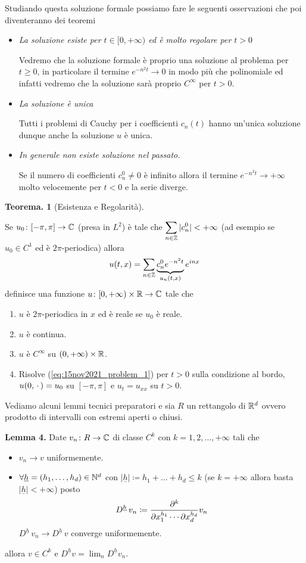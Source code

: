 Studiando questa soluzione formale possiamo fare le seguenti osservazioni che poi diventeranno dei teoremi
\begin{itemize}
	\item \textit{La soluzione esiste per $t \in [0, +\infty)$ ed è molto regolare per $t > 0$}

		Vedremo che la soluzione formale è proprio una soluzione al problema per $t \geq 0$, in particolare il termine $e^{-n^2 t} \to 0$ in modo più che polinomiale ed infatti vedremo che la soluzione sarà proprio $C^\infty$ per $t > 0$.

	\item \textit{La soluzione è unica}

		Tutti i problemi di Cauchy per i coefficienti $c_n(t)$ hanno un'unica soluzione dunque anche la soluzione $u$ è unica.

	\item \textit{In generale non esiste soluzione nel passato.}

		Se il numero di coefficienti $c_n^0 \neq 0$ è infinito allora il termine $e^{-n^2 t} \to +\infty$ molto velocemente per $t < 0$ e la serie diverge.

\end{itemize}

\textbf{Teorema. 1} (Esistenza e Regolarità).

Se $u_0 \colon [-\pi, \pi] \to \mathbb C$ (presa in $L^2$) è tale che $\displaystyle \sum_{n \in \mathbb Z} |c_n^0| < +\infty$ (ad esempio se $u_0 \in C^1$ ed è $2\pi$-periodica) allora
$$
u(t, x) = \sum_{n \in \mathbb Z} \underbrace{c_n^0 e^{-n^2 t}}_{u_n(t,x)} e^{inx}
$$
definisce una funzione $u \colon [0, +\infty) \times \mathbb R \to \mathbb C$ tale che
\begin{enumerate}
	\item $u$ è $2\pi$-periodica in $x$ ed è reale se $u_0$ è reale.
	\item $u$ è continua.
	\item $u$ è $C^\infty$ su $(0, +\infty) \times \mathbb R$.
	\item Risolve (\ref{eq:15nov2021_problem_1}) per $t > 0$ sulla condizione al bordo, $u(0, \,\cdot\,) = u_0$ su $[-\pi, \pi]$ e $u_t = u_{xx}$ su $t > 0$.
\end{enumerate}

Vediamo alcuni lemmi tecnici preparatori e sia $R$ un rettangolo di $\mathbb R^d$ ovvero prodotto di intervalli con estremi aperti o chiusi.

\textbf{Lemma 4.}
Date $v_n \colon R \to \mathbb C$ di classe $C^k$ con $k = 1, 2, \dots, +\infty$ tali che
\begin{itemize}
	\item $v_n \to v$ uniformemente.

	\item $\forall \underline h = (h_1, \dots, h_d) \in \mathbb N^d$ con $|\underline h| \coloneqq h_1 + \dots + h_d \leq k$ (se $k = +\infty$ allora basta $|\underline h| < +\infty$) posto
		$$
		D^{\underline h} \, v_n \coloneqq
		\frac{\partial^k}{\partial x_1^{h_1} \cdots \partial x_d^{h_d}} v_n
		$$
		$D^{\underline h} \, v_n \to D^{\underline h} \, v$ converge uniformemente.
\end{itemize}
allora $v \in C^k$ e $D^{\underline h} v = \lim_{n} D^{\underline h} v_n$.

